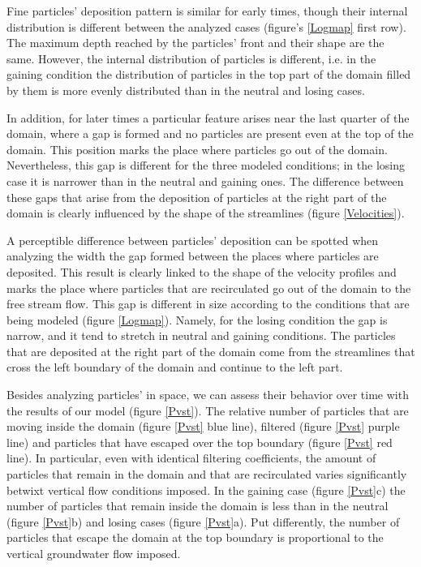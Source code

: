 \documentclass[draft,linenumbers]{agujournal2018}
\begin{document}
Fine particles' deposition pattern is similar for early times, though their internal distribution is different between the analyzed cases (figure's \ref{Logmap} first row). The maximum depth reached by the particles' front and their shape are the same. However, the internal distribution of particles is different, i.e. in the gaining condition the distribution of particles in the top part of the domain filled by them is more evenly distributed than in the neutral and losing cases. 

In addition, for later times a particular feature arises near the last quarter of the domain, where a gap is formed and no particles are present even at the top of the domain. This position marks the place where particles go out of the domain. Nevertheless, this gap is different for the three modeled conditions; in the losing case it is narrower than in the neutral and gaining ones. The difference between these gaps that arise from the deposition of particles at the right part of the domain is clearly influenced by the shape of the streamlines (figure \ref{Velocities}).

A perceptible difference between particles' deposition can be spotted when analyzing the width the gap formed between the places where particles are deposited. This result is clearly linked to the shape of the velocity profiles and marks the place where particles that are recirculated go out of the domain to the free stream flow. This gap is different in size according to the conditions that are being modeled (figure \ref{Logmap}). Namely, for the losing condition the gap is narrow, and it tend to stretch in neutral and gaining conditions. The particles that are deposited at the right part of the domain come from the streamlines that cross the left boundary of the domain and continue to the left part. 

Besides analyzing particles' in space, we can assess their behavior over time with the results of our model (figure \ref{Pvst}). The relative number of particles that are moving inside the domain (figure \ref{Pvst} blue line), filtered (figure \ref{Pvst} purple line) and particles that have escaped over the top boundary (figure \ref{Pvst} red line). In particular, even with identical filtering coefficients, the amount of particles that remain in the domain and that are recirculated varies significantly betwixt vertical flow conditions imposed. In the gaining case (figure \ref{Pvst}c) the number of particles that remain inside the domain is less than in the neutral (figure \ref{Pvst}b) and losing cases (figure \ref{Pvst}a). Put differently, the number of particles that escape the domain at the top boundary is proportional to the vertical groundwater flow imposed.
\end{document}
